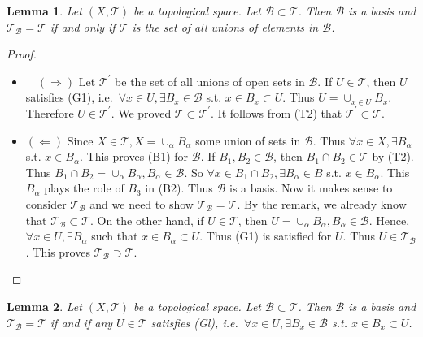 \documentclass[
]{book}
\providecommand{\tightlist}{%
  \setlength{\itemsep}{0pt}\setlength{\parskip}{0pt}}
\newtheorem{lemma}{Lemma}[chapter]
\theoremstyle{definition}
\theoremstyle{definition}
\theoremstyle{definition}
\theoremstyle{definition}
\theoremstyle{remark}
\begin{document}
\begin{lemma}
\protect\hypertarget{lem:lemmaTequalsTB}{}\label{lem:lemmaTequalsTB}Let \((X, \mathcal{T})\) be a topological space. Let \(\mathcal{B} \subset \mathcal{T}\). Then \(\mathcal{B}\) is a basis and \(\mathcal{T}_{\mathcal{B}}=\mathcal{T}\) if and only if \(\mathcal{T}\) is the set of all unions of elements in \(\mathcal{B}\).
\end{lemma}

\begin{proof}
\leavevmode

\begin{itemize}
\tightlist
\item
  \(\quad(\Rightarrow)\) Let \(\mathcal{T}^{\prime}\) be the set of all unions of open sets in \(\mathcal{B}\). If \(U \in \mathcal{T}\), then \(U\) satisfies (G1), i.e.~\(\forall x \in U, \exists B_{x} \in \mathcal{B}\) s.t. \(x \in B_{x} \subset U\). Thus \(U=\cup_{x \in U} B_{x}\). Therefore \(U \in \mathcal{T}^{\prime}\). We proved \(\mathcal{T} \subset \mathcal{T}^{\prime}\). It follows from (T2) that \(\mathcal{T}^{\prime} \subset \mathcal{T}\).
\item
  \((\Leftarrow)\) Since \(X \in \mathcal{T}, X=\cup_{\alpha} B_{\alpha}\) some union of sets in \(\mathcal{B}\). Thus \(\forall x \in X, \exists B_{\alpha}\) s.t. \(x \in B_{\alpha}\). This proves (B1) for \(\mathcal{B}\). If \(B_{1}, B_{2} \in \mathcal{B}\), then \(B_{1} \cap B_{2} \in \mathcal{T}\) by (T2). Thus \(B_{1} \cap B_{2}=\cup_{\alpha} B_{\alpha}, B_{\alpha} \in \mathcal{B}\). So \(\forall x \in B_{1} \cap B_{2}, \exists B_{\alpha} \in B\) s.t. \(x \in B_{\alpha}\). This \(B_{\alpha}\) plays the role of \(B_{3}\) in (B2). Thus \(\mathcal{B}\) is a basis. Now it makes sense to consider \(\mathcal{T}_{\mathcal{B}}\) and we need to show \(\mathcal{T}_{\mathcal{B}}=\mathcal{T}\). By the remark, we already know that \(\mathcal{T}_{\mathcal{B}} \subset \mathcal{T}\). On the other hand, if \(U \in \mathcal{T}\), then \(U=\cup_{\alpha} B_{\alpha}, B_{\alpha} \in \mathcal{B}\). Hence, \(\forall x \in U, \exists B_{\alpha}\) such that \(x \in B_{\alpha} \subset U\). Thus (G1) is satisfied for \(U\). Thus \(U \in \mathcal{T}_{\mathcal{B}}\). This proves \(\mathcal{T}_{\mathcal{B}} \supset \mathcal{T}\).
\end{itemize}

\end{proof}

\begin{lemma}
\protect\hypertarget{lem:lemma110}{}\label{lem:lemma110}Let \((X, \mathcal{T})\) be a topological space. Let \(\mathcal{B} \subset \mathcal{T}\). Then \(\mathcal{B}\) is a basis and \(\mathcal{T}_{\mathcal{B}}=\mathcal{T}\) if and if any \(U \in \mathcal{T}\) satisfies (Gl), i.e.~\(\forall x \in U, \exists B_{x} \in \mathcal{B}\) s.t. \(x \in B_{x} \subset U\).
\end{lemma}
\end{document}
